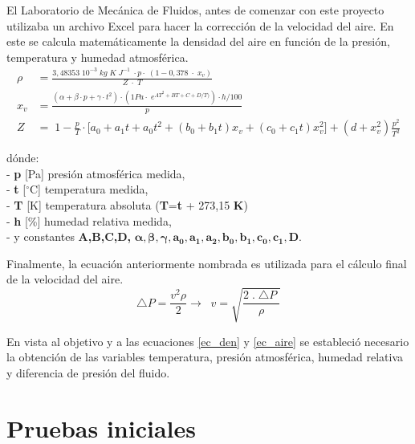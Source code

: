 
El Laboratorio de Mecánica de Fluidos, antes de comenzar con este proyecto utilizaba un archivo Excel para hacer la corrección de la velocidad del aire. En este se calcula matemáticamente la densidad del aire en función de la presión, temperatura y humedad atmosférica.
\begin{align}
	\rho&=\frac{3,48353\;10^{-3}\;kg\;K\;J^{-1}\;\cdot p\cdot\;(1-0,378\;\cdot\;x_v)}{Z\;\cdot\;T} \label{ec_den}\\
	x_v&=\frac{(\alpha+\beta\cdot p+\gamma\cdot t^2)\cdot(1Pa\cdot\;e^{AT^2+BT+C+D/T)})\cdot h/100}p\\
	Z&=\;1-\frac pT\cdot\lbrack a_0+a_1t+a_0t^2+(b_0+b_1t)x_v+(c_0+c_1t)x_v^2\rbrack+(d+x_v^2)\frac{p^2}{T^2}
\end{align}

dónde:\\
- \textbf{p } [Pa] presión atmosférica medida,\\
- \textbf{t } [$^{\circ}$C] temperatura medida,\\
- \textbf{T } [K] temperatura absoluta (\textbf{T}=\textbf{t} + 273,15 \textbf{K})\\
- \textbf{h } [\%] humedad relativa medida,\\
- y constantes \textbf{A,B,C,D,} $\boldsymbol{\alpha , \beta  , \gamma , a_0, a_1 ,a_2 ,b_0  ,b_1 , c_0 , c_1, D. }$


Finalmente, la ecuación anteriormente nombrada es utilizada para el cálculo final de la velocidad del aire.
\begin{equation}
	\triangle P=\frac{v^2\rho}2\rightarrow\;\;v=\sqrt{\frac{2\;.\;\triangle P\;}\rho}
	\label{ec_aire}
\end{equation}

\begin{comment}
Tanto las ecuaciones de densidad ec.(\ref{ec_den})
y la ecuación del cálculo de velocidad  ec.(\ref{ec_aire})
se desarrolló dentro del programa de \textbf{Arduino} para observar como dato final la velocidad del aire.
\end{comment}

En vista al objetivo y a las ecuaciones \ref{ec_den} y \ref{ec_aire} se estableció necesario la obtención de las variables temperatura, presión atmosférica, humedad relativa y diferencia de presión del fluido. 

\section{Pruebas iniciales}

